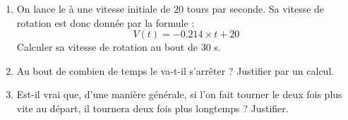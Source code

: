 \documentclass[exercice]{thedocument}%
\begin{document}
\begin{enumerate}
    \item On lance le  à une vitesse initiale de $20$ tours
    par seconde. Sa vitesse de rotation est donc donnée par la formule :
    $$V(t)= -0.214 \times t + 20$$
    Calculer sa vitesse de rotation au bout de $30$ s.
    \item Au bout de combien de temps le  va-t-il s'arrêter ?
    Justifier par un calcul.
    \item Est-il vrai que, d'une manière générale, si l'on fait tourner le
     deux fois plus vite au départ, il tournera deux
    fois plus longtemps ? Justifier.
\end{enumerate}
\end{document}
